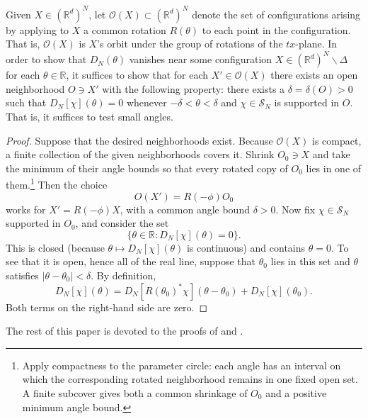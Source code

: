 \documentclass[11pt, letterpaper, reqno]{amsart}
\theoremstyle{definition}
\newenvironment{lemma}
{\pushQED{\qed}\renewcommand{\qedsymbol}{$\blacksquare$}\lemmax}
{\popQED\endlemmax}
\theoremstyle{remark}
\newcommand{\bbR}{\mathbb{R}}
\newcommand{\calO}{\mathcal{O}}
\newcommand{\calS}{\mathcal{S}}
\begin{document}
Given $X\in (\bbR^d)^N$, let $\calO(X)\subset (\bbR^d)^N$ denote the set of configurations arising by applying to $X$ a common rotation $R(\theta)$ to each point in the configuration. That is, $\calO(X)$ is $X$'s orbit under the group of rotations of the $tx$-plane.
\begin{lemma}\label{lem:small_angle}
     In order to show that $D_N(\theta)$ vanishes near some configuration $X\in (\bbR^d)^N\backslash \Delta$ for each $\theta\in \bbR$, it suffices to show that for each $X'\in \calO(X)$ there exists an open neighborhood $O\ni X'$ with the following property:  there exists a $\delta=\delta(O)>0$ such that $D_N[\chi](\theta)=0$ whenever $-\delta<\theta<\delta$ and $\chi \in \calS_N$ is supported in $O$. 
\end{lemma}
That is, it suffices to test small angles.
\begin{proof}
    Suppose that the desired neighborhoods exist. Because $\calO(X)$ is compact, a finite collection of the given neighborhoods covers it. Shrink $O_0\ni X$ and take the minimum of their angle bounds so that every rotated copy of $O_0$ lies in one of them.\footnote{Apply compactness to the parameter circle: each angle has an interval on which the corresponding rotated neighborhood remains in one fixed open set. A finite subcover gives both a common shrinkage of $O_0$ and a positive minimum angle bound.} Then the choice 
    \begin{equation} 
    O(X') = R(-\phi) O_0
    \end{equation} 
    works for $X'=R(-\phi)X$, with a common angle bound $\delta>0$.
    Now fix $\chi\in \calS_N$ supported in $O_0$, and consider the set 
    \begin{equation}
        \{\theta\in \bbR: D_N[\chi](\theta)=0\}.
    \end{equation}
    This is closed (because $\theta\mapsto D_N[\chi](\theta)$ is continuous) and contains $\theta=0$. 
    To see that it is open, hence all of the real line, suppose that $\theta_0$ lies in this set and $\theta$ satisfies $|\theta-\theta_0|<\delta$. By definition, 
    \begin{equation}
        D_N[\chi](\theta) = D_N[R(\theta_0)^* \chi ](\theta-\theta_0) + D_N[\chi](\theta_0).
    \end{equation}
    Both terms on the right-hand side are zero.
\end{proof}



The rest of this paper is devoted to the proofs of  and .
\end{document}
